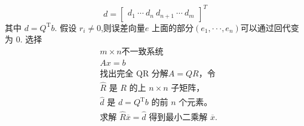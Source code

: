 \documentclass[UTF8,5pt,a4paper]{ctexart} %
\begin{document}
\begin{multicols}{4}
    \begin{equation*}     
        d =\begin{bmatrix}
            d_1 \
            \cdots \
            d_n \
            d_{n+1} \
            \cdots \
            d_m
            \end{bmatrix}^{T}
        \end{equation*}
其中 $d=Q^{\mathrm{T}}b.$ 假设 $r_i\neq0$,则误差向量$e$ 上面的部分$(e_1,\cdotp\cdotp\cdotp,e_n)$可以通过回代变为 0. 选择
$$
\boxed{
\begin{aligned}
    & m \times n\text{不一致系统} \\
    & Ax=b \\
    & \text{找出完全 QR 分解} A=QR\text{，令} \\
    & \hat{R} \text{ 是 } R \text{ 的上 } n \times n \text{ 子矩阵，} \\
    & \hat{d} \text{ 是 } d = Q^{\mathrm{T}}b \text{ 的前 } n \text{ 个元素。} \\
    & \text{求解 } \hat{R} \overline{x} = \hat{d} \text{ 得到最小二乘解 } \overline{x}.
\end{aligned}
}
 $$

\end{multicols}
\end{document}
